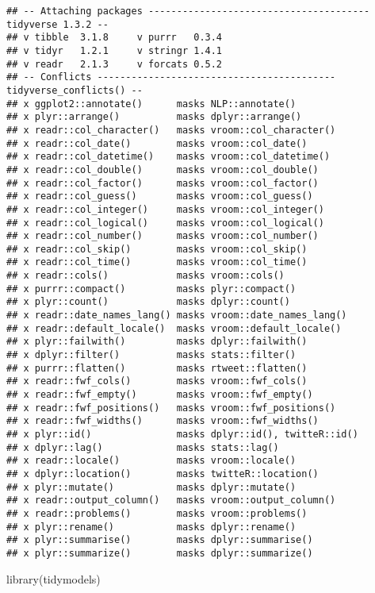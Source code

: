 \documentclass[
]{article}
\newenvironment{Shaded}{\begin{snugshade}}{\end{snugshade}}
\newcommand{\FunctionTok}[1]{\textcolor[rgb]{0.00,0.00,0.00}{#1}}
\newcommand{\NormalTok}[1]{#1}
\begin{document}
\begin{verbatim}
## -- Attaching packages --------------------------------------- tidyverse 1.3.2 --
## v tibble  3.1.8     v purrr   0.3.4
## v tidyr   1.2.1     v stringr 1.4.1
## v readr   2.1.3     v forcats 0.5.2
## -- Conflicts ------------------------------------------ tidyverse_conflicts() --
## x ggplot2::annotate()      masks NLP::annotate()
## x plyr::arrange()          masks dplyr::arrange()
## x readr::col_character()   masks vroom::col_character()
## x readr::col_date()        masks vroom::col_date()
## x readr::col_datetime()    masks vroom::col_datetime()
## x readr::col_double()      masks vroom::col_double()
## x readr::col_factor()      masks vroom::col_factor()
## x readr::col_guess()       masks vroom::col_guess()
## x readr::col_integer()     masks vroom::col_integer()
## x readr::col_logical()     masks vroom::col_logical()
## x readr::col_number()      masks vroom::col_number()
## x readr::col_skip()        masks vroom::col_skip()
## x readr::col_time()        masks vroom::col_time()
## x readr::cols()            masks vroom::cols()
## x purrr::compact()         masks plyr::compact()
## x plyr::count()            masks dplyr::count()
## x readr::date_names_lang() masks vroom::date_names_lang()
## x readr::default_locale()  masks vroom::default_locale()
## x plyr::failwith()         masks dplyr::failwith()
## x dplyr::filter()          masks stats::filter()
## x purrr::flatten()         masks rtweet::flatten()
## x readr::fwf_cols()        masks vroom::fwf_cols()
## x readr::fwf_empty()       masks vroom::fwf_empty()
## x readr::fwf_positions()   masks vroom::fwf_positions()
## x readr::fwf_widths()      masks vroom::fwf_widths()
## x plyr::id()               masks dplyr::id(), twitteR::id()
## x dplyr::lag()             masks stats::lag()
## x readr::locale()          masks vroom::locale()
## x dplyr::location()        masks twitteR::location()
## x plyr::mutate()           masks dplyr::mutate()
## x readr::output_column()   masks vroom::output_column()
## x readr::problems()        masks vroom::problems()
## x plyr::rename()           masks dplyr::rename()
## x plyr::summarise()        masks dplyr::summarise()
## x plyr::summarize()        masks dplyr::summarize()
\end{verbatim}

\begin{Shaded}
\begin{Highlighting}[]
\FunctionTok{library}\NormalTok{(tidymodels)}
\end{Highlighting}
\end{Shaded}
\end{document}
